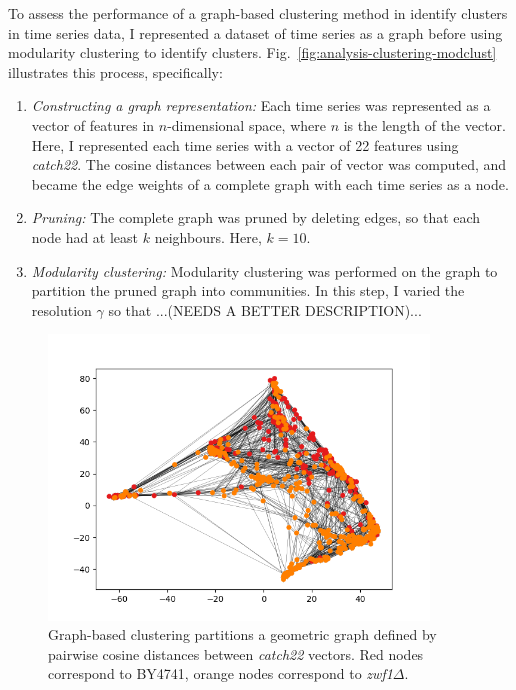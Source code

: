 To assess the performance of a graph-based clustering method in identify clusters in time series data, I represented a dataset of time series as a graph before using modularity clustering to identify clusters.
Fig.\ \ref{fig:analysis-clustering-modclust} illustrates this process, specifically:
\begin{enumerate}
  \item \emph{Constructing a graph representation:}
        Each time series was represented as a vector of features in $n$-dimensional space, where $n$ is the length of the vector.
        Here, I represented each time series with a vector of 22 features using \textit{catch22}.
        The cosine distances between each pair of vector was computed, and became the edge weights of a complete graph with each time series as a node.
  \item \emph{Pruning:}
        The complete graph was pruned by deleting edges, so that each node had at least $k$ neighbours.
        Here, $k=10$.
  \item \emph{Modularity clustering:}
        Modularity clustering was performed on the graph to partition the pruned graph into communities.
        In this step, I varied the resolution $\gamma$ so that ...(NEEDS A BETTER DESCRIPTION)...
\end{enumerate}


\begin{figure}[htbp]
  \centering
  \includegraphics[width=0.9\textwidth]{graphclustering}
  \caption{
    Graph-based clustering partitions a geometric graph defined by pairwise cosine distances between \textit{catch22} vectors.
    Red nodes correspond to BY4741, orange nodes correspond to \textit{zwf1$\Delta$}.
  }
  \label{fig:graphclustering}
\end{figure}

